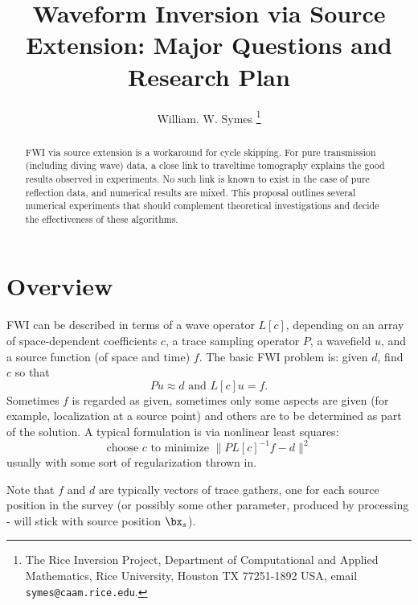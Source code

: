 \title{Waveform Inversion via Source Extension: Major Questions and Research Plan}
\author{William. W. Symes \thanks{The Rice Inversion Project,
Department of Computational and Applied Mathematics, Rice University,
Houston TX 77251-1892 USA, email {\tt symes@caam.rice.edu}.}}




\maketitle
\begin{abstract}
FWI via source extension is a workaround for cycle skipping. For pure transmission (including diving wave) data, a close link to traveltime tomography explains the good results observed in experiments. No such link is known to exist in the case of pure reflection data, and numerical results are mixed. This proposal outlines several numerical experiments that should complement theoretical investigations and decide the effectiveness of these algorithms.
\end{abstract}

\section{Overview}
FWI can be described in terms of a wave operator $L[c]$, depending on an array of space-dependent coefficients $c$, a trace sampling operator $P$, a wavefield $u$, and a source function (of space and time) $f$. The basic FWI problem is: given $d$, find $c$ so that 
\begin{equation}
\label{eqn:fwi}
Pu \approx d \mbox{ and } L[c]u = f.
\end{equation}
Sometimes $f$ is regarded as given, sometimes only some aspects are given (for example, localization at a source point) and others are to be determined as part of the solution. A typical formulation is via nonlinear least squares:
\[
\mbox{choose } c \mbox{ to minimize } \|PL[c]^{-1}f -d \|^2 
\]
usually with some sort of regularization thrown in.

Note that $f$ and $d$ are typically vectors of trace gathers, one for each source position in the survey (or possibly some other parameter, produced by processing - will stick with source position $\bx_s$).

